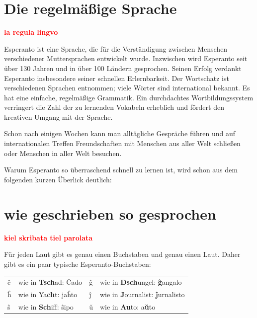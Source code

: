 \documentclass{leaflet}
\begin{document}
\section{Die regelmäßige Sprache}

\vspace{-.4cm}

\begin{flushright}
\textbf{\large \textcolor{red}{la regula lingvo}}
\end{flushright}

\vspace{-.2cm}

Esperanto ist eine Sprache, die für die Verständigung zwischen Menschen verschiedener Muttersprachen entwickelt wurde. Inzwischen wird Esperanto seit über 130 Jahren und in über 100 Ländern gesprochen. Seinen Erfolg verdankt Esperanto insbesondere seiner schnellen Erlernbarkeit. Der Wortschatz ist verschiedenen Sprachen entnommen; viele Wörter sind international bekannt. Es hat eine einfache, regelmäßige Grammatik. Ein durchdachtes Wortbildungssystem verringert die Zahl der zu lernenden Vokabeln erheblich und fördert den kreativen Umgang mit der Sprache.

Schon nach einigen Wochen kann man alltägliche Gespräche führen und auf internationalen Treffen Freundschaften mit Menschen aus aller Welt schließen oder Menschen in aller Welt besuchen.

Warum Esperanto so überraschend schnell zu lernen ist, wird schon aus dem folgenden kurzen Überlick deutlich:

\vspace{-.4cm}

\section{wie geschrieben so gesprochen}

\vspace{-.2cm}

\begin{flushright}
\textbf{\large \textcolor{red}{kiel skribata tiel parolata}}
\end{flushright}

\vspace{-.2cm}

Für jeden Laut gibt es genau einen Buchstaben und genau einen Laut. Daher gibt es ein paar typische Esperanto-Buchstaben:

\begin{tabular}{llll}
		ĉ & wie in \textbf{Tsch}ad: Ĉado & ĝ & 
		wie in \textbf{Dsch}ungel: \textbf{ĝ}angalo\\
		ĥ & wie in Ya\textbf{ch}t: jaĥto & ĵ & 
		wie in \textbf{J}ournalist: \textbf{ĵ}urnalisto\\
		ŝ & wie in \textbf{Sch}iff: ŝipo & ŭ & 
		wie in \textbf{Au}to: a\textbf{ŭ}to
\end{tabular}
\end{document}
